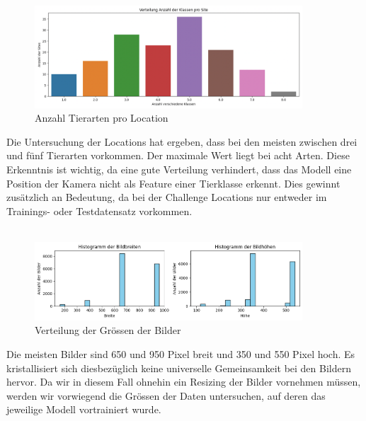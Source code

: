 \documentclass{article}
\begin{document}
\begin{figure}[!h]
    \centering
    \includegraphics[width=10cm]{plots/Tierarten pro Location.png}
    \caption{\label{fig:number_of_animals_per_location}Anzahl Tierarten pro Location}
\end{figure}

\noindent
Die Untersuchung der Locations hat ergeben, dass bei den meisten zwischen drei und fünf Tierarten vorkommen. Der maximale Wert liegt bei acht Arten. Diese Erkenntnis ist wichtig, da eine gute Verteilung verhindert, dass das Modell eine Position der Kamera nicht als Feature einer Tierklasse erkennt. Dies gewinnt zusätzlich an Bedeutung, da bei der Challenge Locations nur entweder im Trainings- oder Testdatensatz vorkommen.\\\\

\newpage

\begin{figure}[!h]
    \centering
    \includegraphics[width=10cm]{plots/Groesse der Bilder.png}
    \caption{\label{fig:size_distribution_of_pictures}Verteilung der Grössen der Bilder}
\end{figure}

\noindent
Die meisten Bilder sind 650 und 950 Pixel breit und 350 und 550 Pixel hoch. Es kristallisiert sich diesbezüglich keine universelle Gemeinsamkeit bei den Bildern hervor. Da wir in diesem Fall ohnehin ein Resizing der Bilder vornehmen müssen, werden wir vorwiegend die Grössen der Daten untersuchen, auf deren das jeweilige Modell vortrainiert wurde.
\end{document}
